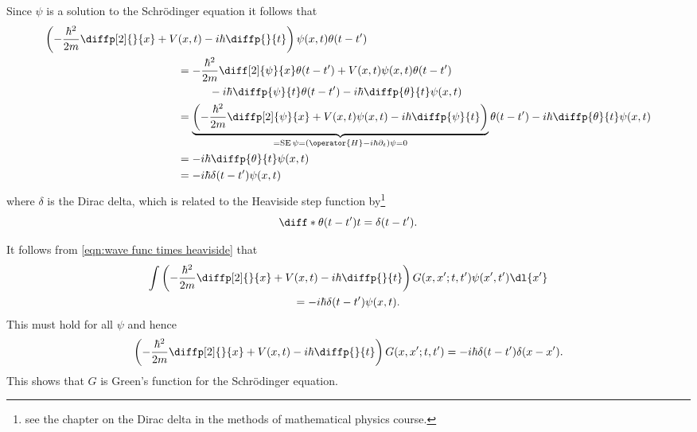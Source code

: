 \documentclass[fleqn]{NotesClass}
\newcommand*{\hamiltonian}{H}
\DeclareMathOperator{\SE}{SE}
\begin{document}
    Since \(\psi\) is a solution to the Schr\"odinger equation it follows that
    \begin{align}
        \left( -\frac{\hbar^2}{2m} \diffp[2]{}{x} + V(x, t) - i\hbar\diffp{}{t} \right) \psi(x, t)\theta(t - t') &\\
        &\hspace{-6cm}= -\frac{\hbar^2}{2m}\diff[2]{\psi}{x}\theta(t - t') + V(x, t)\psi(x, t)\theta(t - t')\\
        &\hspace{-5cm}- i\hbar\diffp{\psi}{t}\theta(t - t') - i\hbar\diffp{\theta}{t}\psi(x, t)\\
        &\hspace{-6cm}= \underbrace{\left( -\frac{\hbar^2}{2m}\diffp[2]{\psi}{x} + V(x, t)\psi(x, t) - i\hbar\diffp{\psi}{t} \right)}_{=\SE\psi = (\operator{\hamiltonian} - i\hbar\partial_t)\psi = 0}\theta(t - t') - i\hbar\diffp{\theta}{t}\psi(x, t)\\
        &\hspace{-6cm}= -i\hbar\diffp{\theta}{t}\psi(x, t)\\
        &\hspace{-6cm}= -i\hbar\delta(t - t')\psi(x, t)
    \end{align}
    where \(\delta\) is the Dirac delta, which is related to the Heaviside step function by\footnote{see the chapter on the Dirac delta in the methods of mathematical physics course.}
    \begin{equation}
        \diff*{\theta(t - t')}{t} = \delta(t - t').
    \end{equation}
    
    It follows from \cref{eqn:wave func times heaviside} that
    \begin{multline}
        \int \left( -\frac{\hbar^2}{2m} \diffp[2]{}{x} + V(x, t) - i\hbar\diffp{}{t} \right) G(x, x'; t, t')\psi(x', t') \dl{x'}\\
        = -i\hbar\delta(t - t')\psi(x, t).
    \end{multline}
    This must hold for all \(\psi\) and hence
    \begin{equation}
        \left( -\frac{\hbar^2}{2m}\diffp[2]{}{x} + V(x, t) - i\hbar\diffp{}{t} \right)G(x, x'; t, t') = -i\hbar\delta(t - t')\delta(x - x').
    \end{equation}
    This shows that \(G\) is Green's function for the Schr\"odinger equation.
    
\end{document}
